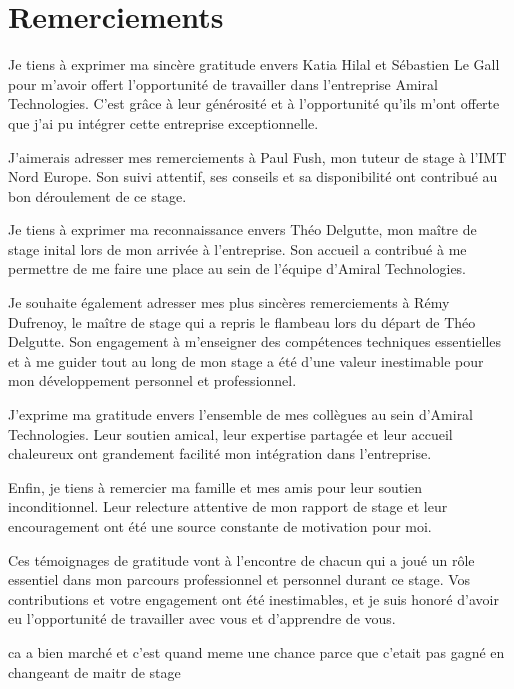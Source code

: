 \section*{Remerciements}
Je tiens à exprimer ma sincère gratitude envers Katia Hilal et Sébastien Le Gall pour m'avoir offert l'opportunité de travailler dans l'entreprise Amiral Technologies.
C'est grâce à leur générosité et à l'opportunité qu'ils m'ont offerte que j'ai pu intégrer cette entreprise exceptionnelle.

J'aimerais adresser mes remerciements à Paul Fush, mon tuteur de stage à l'IMT Nord Europe.
Son suivi attentif, ses conseils et sa disponibilité ont contribué au bon déroulement de ce stage.

Je tiens à exprimer ma reconnaissance envers Théo Delgutte, mon maître de stage inital lors de mon arrivée à l'entreprise.
Son accueil a contribué à me permettre de me faire une place au sein de l'équipe d'Amiral Technologies.

Je souhaite également adresser mes plus sincères remerciements à Rémy Dufrenoy, le maître de stage qui a repris le flambeau lors du départ de Théo Delgutte.
Son engagement à m'enseigner des compétences techniques essentielles et à me guider tout au long de mon stage a été d'une valeur inestimable pour mon développement personnel et professionnel.

J'exprime ma gratitude envers l'ensemble de mes collègues au sein d'Amiral Technologies.
Leur soutien amical, leur expertise partagée et leur accueil chaleureux ont grandement facilité mon intégration dans l'entreprise.

Enfin, je tiens à remercier ma famille et mes amis pour leur soutien inconditionnel.
Leur relecture attentive de mon rapport de stage et leur encouragement ont été une source constante de motivation pour moi.

Ces témoignages de gratitude vont à l'encontre de chacun qui a joué un rôle essentiel dans mon parcours professionnel et personnel durant ce stage.
Vos contributions et votre engagement ont été inestimables, et je suis honoré d'avoir eu l'opportunité de travailler avec vous et d'apprendre de vous.



ca a bien marché et c'est quand meme une chance parce que c'etait pas gagné en changeant de maitr de stage